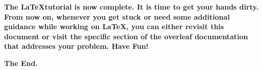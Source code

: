 \documentclass[12pt, letterpaper, twoside]{article}
\begin{document}

\textbf{The \LaTeX tutorial is now complete. It is time to get your hands dirty. From now on, whenever you get stuck or need some additional guidance while working on \LaTeX, you can either revisit this document or visit the specific section of the overleaf documentation that addresses your problem. Have Fun!}

\textbf{The End.}
\end{document}
